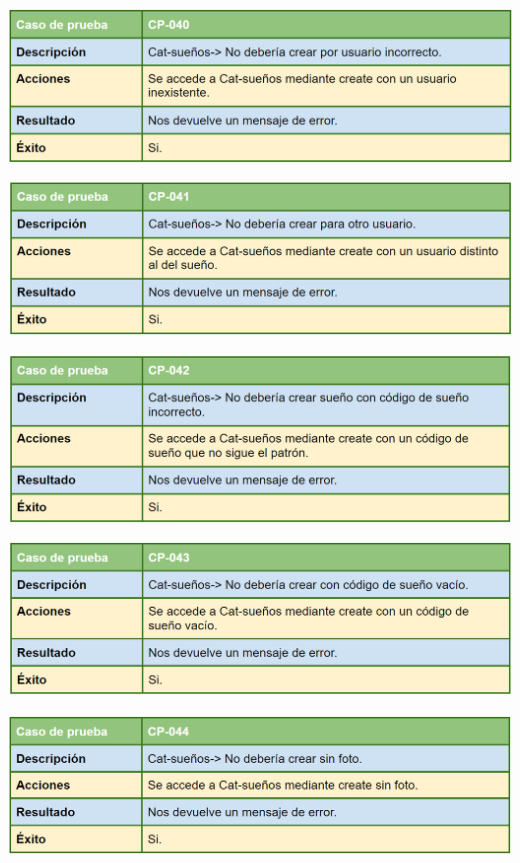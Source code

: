 \bigskip

\includegraphics[width=\textwidth]{img/cap7/cp-040.png}

\bigskip

\includegraphics[width=\textwidth]{img/cap7/cp-041.png}

\bigskip

\includegraphics[width=\textwidth]{img/cap7/cp-042.png}

\bigskip

\includegraphics[width=\textwidth]{img/cap7/cp-043.png}

\bigskip

\includegraphics[width=\textwidth]{img/cap7/cp-044.png}

